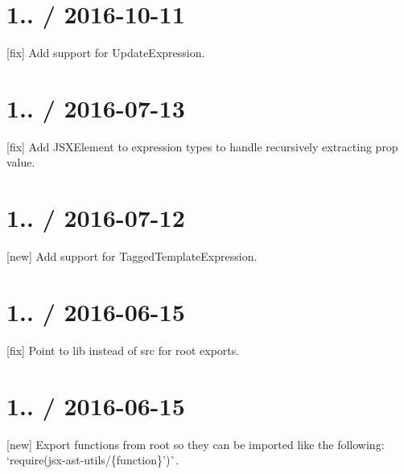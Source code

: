 \section*{1.. / 2016-\/10-\/11 }


\begin{DoxyItemize}
\item \mbox{[}fix\mbox{]} Add support for {\ttfamily Update\+Expression}.
\end{DoxyItemize}

\section*{1.. / 2016-\/07-\/13 }


\begin{DoxyItemize}
\item \mbox{[}fix\mbox{]} Add {\ttfamily J\+S\+X\+Element} to expression types to handle recursively extracting prop value.
\end{DoxyItemize}

\section*{1.. / 2016-\/07-\/12 }


\begin{DoxyItemize}
\item \mbox{[}new\mbox{]} Add support for {\ttfamily Tagged\+Template\+Expression}.
\end{DoxyItemize}

\section*{1.. / 2016-\/06-\/15 }


\begin{DoxyItemize}
\item \mbox{[}fix\mbox{]} Point to {\ttfamily lib} instead of {\ttfamily src} for root exports.
\end{DoxyItemize}

\section*{1.. / 2016-\/06-\/15 }


\begin{DoxyItemize}
\item \mbox{[}new\mbox{]} Export functions from root so they can be imported like the following\+: `require(\textquotesingle{}jsx-\/ast-\/utils/\{function\}')\`{}.
\end{DoxyItemize}

